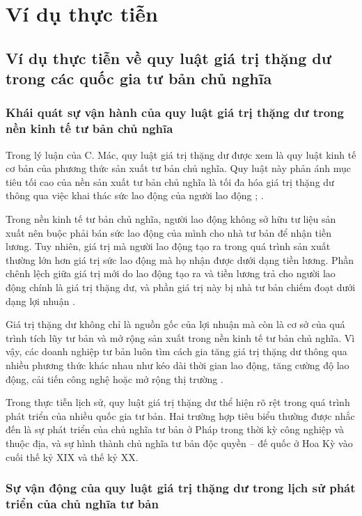\section{Ví dụ thực tiễn}
\subsection{Ví dụ thực tiễn về quy luật giá trị thặng dư trong các quốc gia tư bản chủ nghĩa}

\subsubsection{Khái quát sự vận hành của quy luật giá trị thặng dư trong nền kinh tế tư bản chủ nghĩa}

Trong lý luận của C. Mác, quy luật giá trị thặng dư được xem là quy luật kinh tế cơ bản của phương thức sản xuất tư bản chủ nghĩa. Quy luật này phản ánh mục tiêu tối cao của nền sản xuất tư bản chủ nghĩa là tối đa hóa giá trị thặng dư thông qua việc khai thác sức lao động của người lao động \cite{gt}; \cite{Capital}.

Trong nền kinh tế tư bản chủ nghĩa, người lao động không sở hữu tư liệu sản xuất nên buộc phải bán sức lao động của mình cho nhà tư bản để nhận tiền lương. Tuy nhiên, giá trị mà người lao động tạo ra trong quá trình sản xuất thường lớn hơn giá trị sức lao động mà họ nhận được dưới dạng tiền lương. Phần chênh lệch giữa giá trị mới do lao động tạo ra và tiền lương trả cho người lao động chính là giá trị thặng dư, và phần giá trị này bị nhà tư bản chiếm đoạt dưới dạng lợi nhuận \cite{Capital}.

Giá trị thặng dư không chỉ là nguồn gốc của lợi nhuận mà còn là cơ sở của quá trình tích lũy tư bản và mở rộng sản xuất trong nền kinh tế tư bản chủ nghĩa. Vì vậy, các doanh nghiệp tư bản luôn tìm cách gia tăng giá trị thặng dư thông qua nhiều phương thức khác nhau như kéo dài thời gian lao động, tăng cường độ lao động, cải tiến công nghệ hoặc mở rộng thị trường \cite{gt}.

Trong thực tiễn lịch sử, quy luật giá trị thặng dư thể hiện rõ rệt trong quá trình phát triển của nhiều quốc gia tư bản. Hai trường hợp tiêu biểu thường được nhắc đến là sự phát triển của chủ nghĩa tư bản ở Pháp trong thời kỳ công nghiệp và thuộc địa, và sự hình thành chủ nghĩa tư bản độc quyền – đế quốc ở Hoa Kỳ vào cuối thế kỷ XIX và thế kỷ XX.

\subsubsection{Sự vận động của quy luật giá trị thặng dư trong lịch sử phát triển của chủ nghĩa tư bản}


